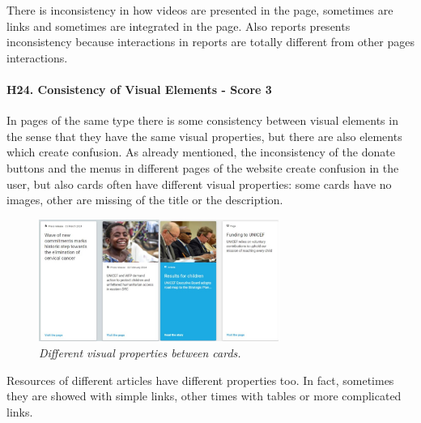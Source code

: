 \newline There is inconsistency in how videos are presented in the page, sometimes are links and sometimes are integrated in the page.
\newline Also reports presents inconsistency because interactions in reports are totally different from other pages interactions.
\newline
\newline \paragraph{H24. Consistency of Visual Elements - Score 3}  \label{subsec:H24}	In pages of the same type there is some consistency between visual elements in the sense that they have the same visual properties, but there are also elements which create confusion.
\newline As already mentioned, the inconsistency of the donate buttons and the menus in different pages of the website create confusion in the user, but also cards often have different visual properties: some cards have no images, other are missing of the title or the description.
\begin{figure}[!h]
	\begin{center}
		\includegraphics[width=0.7\textwidth]{FinalScores28.jpg}
		\captionsetup{font=small}
		\caption{\textit{Different visual properties between cards.}}
	\end{center}
\end{figure}
\newline Resources of different articles have different properties too. In fact, sometimes they are showed with simple links, other times with tables or more complicated links.
